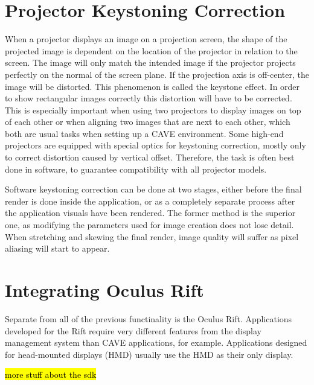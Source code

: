 \documentclass[12pt,a4paper,oneside,pdftex]{report}
\begin{document}
\section{Projector Keystoning Correction}
\label{section:keystonecorrection}

When a projector displays an image on a projection screen, the shape of the projected image is dependent on the location of the projector in relation to the screen. The image will only match the intended image if the projector projects perfectly on the normal of the screen plane. If the projection axis is off-center, the image will be distorted. This phenomenon is called the keystone effect. In order to show rectangular images correctly this distortion will have to be corrected. This is especially important when using two projectors to display images on top of each other or when aligning two images that are next to each other, which both are usual tasks when setting up a CAVE environment. Some high-end projectors are equipped with special optics for keystoning correction, mostly only to correct distortion caused by vertical offset. Therefore, the task is often best done in software, to guarantee compatibility with all projector models.

Software keystoning correction can be done at two stages, either before the final render is done inside the application, or as a completely separate process after the application visuals have been rendered. The former method is the superior one, as modifying the parameters used for image creation does not lose detail. When stretching and skewing the final render, image quality will suffer as pixel aliasing will start to appear.

\cite{TUGrazKeystoning}

\section{Integrating Oculus Rift}
\label{section:integratingoculusrift}

Separate from all of the previous functinality is the Oculus Rift. Applications developed for the Rift require very different features from the display management system than CAVE applications, for example. Applications designed for head-mounted displays (HMD) usually use the HMD as their only display. 

\hl{more stuff about the sdk}

\end{document}

